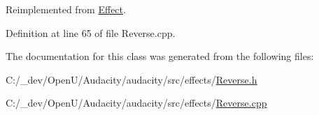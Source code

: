Reimplemented from \hyperlink{class_effect_a005d1433b7d816b0765a0a72a086061c}{Effect}.



Definition at line 65 of file Reverse.\+cpp.



The documentation for this class was generated from the following files\+:\begin{DoxyCompactItemize}
\item 
C\+:/\+\_\+dev/\+Open\+U/\+Audacity/audacity/src/effects/\hyperlink{_reverse_8h}{Reverse.\+h}\item 
C\+:/\+\_\+dev/\+Open\+U/\+Audacity/audacity/src/effects/\hyperlink{_reverse_8cpp}{Reverse.\+cpp}\end{DoxyCompactItemize}
